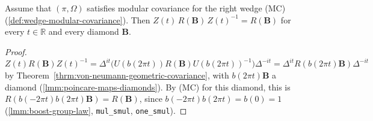 \begin{lemma}
    \label{lmm:wedge-modular-defect-local}
    \leanok
    Assume that $(\pi, \Omega)$ satisfies modular covariance for the right wedge (MC) (\ref{def:wedge-modular-covariance}). Then $Z(t)\,R(\mathbf{B})\,Z(t)^{-1} = R(\mathbf{B})$ for every $t \in \mathbb{R}$ and every diamond $\mathbf{B}$.
\end{lemma}
\begin{proof}
    \leanok
    $Z(t)R(\mathbf{B})Z(t)^{-1} = \Delta^{it}\big(U(b(2\pi t))R(\mathbf{B})U(b(2\pi t))^{-1}\big)\Delta^{-it} = \Delta^{it}R(b(2\pi t)\mathbf{B})\Delta^{-it}$ by Theorem~\ref{thrm:von-neumann-geometric-covariance}, with $b(2\pi t)\mathbf{B}$ a diamond (\ref{lmm:poincare-maps-diamonds}). By (MC) for this diamond, this is $R(b(-2\pi t)b(2\pi t)\mathbf{B}) = R(\mathbf{B})$, since $b(-2\pi t)b(2\pi t) = b(0) = 1$ (\ref{lmm:boost-group-law}, \texttt{mul\_smul}, \texttt{one\_smul}).
\end{proof}

